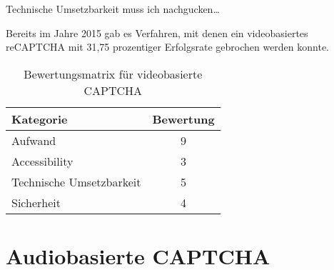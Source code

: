 Technische Umsetzbarkeit muss ich nachgucken\dots

Bereits im Jahre 2015 gab es Verfahren, mit denen ein videobasiertes reCAPTCHA mit 31,75 prozentiger Erfolgsrate gebrochen werden konnte. \cite[p.xx]{surveyofresearch}


\begin{table}[h!]
    \caption{Bewertungsmatrix für videobasierte CAPTCHA}
    \begin{center}
        \begin{tabular}{l|c}
            Kategorie                       & Bewertung \\\hline
            Aufwand                         & 9         \\
            Accessibility                   & 3        \\
            Technische Umsetzbarkeit        & 5         \\
            Sicherheit                      & 4         
        \end{tabular}
    \end{center}
\end{table}

\section{Audiobasierte CAPTCHA}

